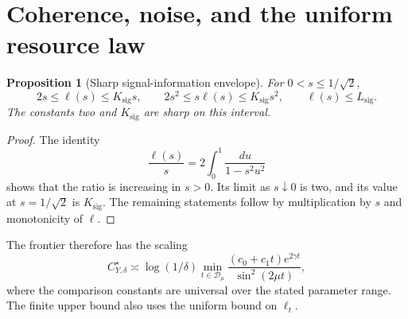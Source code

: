 \documentclass[11pt,a4paper]{article}
\newtheorem{proposition}[theorem]{Proposition}
\theoremstyle{definition}
\theoremstyle{remark}
\numberwithin{equation}{section}
\begin{document}
\section{Coherence, noise, and the uniform resource law}\label{sec:scalingresearch}
\begin{proposition}[Sharp signal-information envelope]\label{prop:boost-envelope}
For $0<s\le1/\sqrt2$,
\begin{equation}\label{eq:klbounds}
2s\le\ell(s)\le K_{\mathrm{sig}}s,\qquad
2s^2\le s\ell(s)\le K_{\mathrm{sig}}s^2,\qquad \ell(s)\le L_{\mathrm{sig}}.
\end{equation}
The constants two and $K_{\mathrm{sig}}$ are sharp on this interval.
\end{proposition}
\begin{proof}
The identity
\[
\frac{\ell(s)}s=2\int_0^1\frac{du}{1-s^2u^2}
\]
shows that the ratio is increasing in $s>0$. Its limit as $s\downarrow 0$
is two, and its value at $s=1/\sqrt2$ is $K_{\mathrm{sig}}$. The remaining statements
follow by multiplication by $s$ and monotonicity of $\ell$.
\end{proof}

The frontier therefore has the scaling
\begin{equation}\label{eq:costsin}
 C_{Y,\delta}^\star\asymp
 \log(1/\delta)
 \min_{t\in\mathcal D_\mu}
 \frac{(c_0+c_1t)e^{2\gamma t}}{\sin^2(2\mu t)},
\end{equation}
where the comparison constants are universal over the stated parameter
range. The finite upper bound also uses the uniform bound on $\ell_t$.
\end{document}
